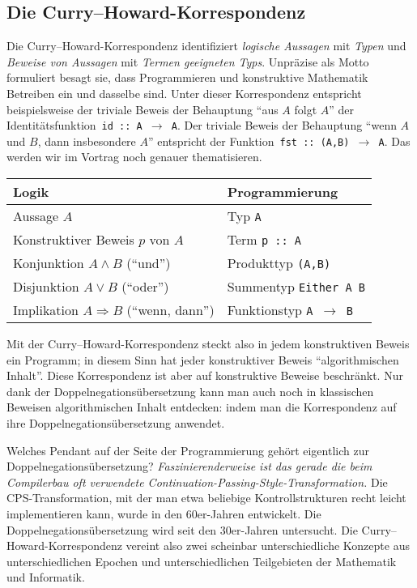 \documentclass[a4paper,ngerman,10pt]{scrartcl}
\theoremstyle{plain}
\begin{document}
\subsection*{Die Curry--Howard-Korrespondenz}

Die Curry--Howard-Korrespondenz identifiziert \emph{logische Aussagen} mit
\emph{Typen} und \emph{Beweise von Aussagen} mit \emph{Termen geeigneten Typs}.
Unpräzise als Motto formuliert besagt sie, dass Programmieren und konstruktive
Mathematik Betreiben ein und dasselbe sind. Unter dieser Korrespondenz
entspricht beispielsweise der triviale Beweis der Behauptung "`aus $A$ folgt
$A$"' der Identitätsfunktion~\texttt{id :: A $\to$ A}. Der triviale Beweis der
Behauptung "`wenn $A$ und $B$, dann insbesondere $A$"' entspricht der
Funktion~\texttt{fst :: (A,B) $\to$ A}. Das werden wir im Vortrag noch genauer
thematisieren.

\begin{center}\begin{tabular}{ll}
  \toprule
  Logik & Programmierung \\\midrule
  Aussage $A$ & Typ \texttt{A} \\
  Konstruktiver Beweis $p$ von $A$ & Term \texttt{p :: A} \\
  Konjunktion $A \wedge B$ ("`und"') & Produkttyp \texttt{(A,B)} \\
  Disjunktion $A \vee B$ ("`oder"') & Summentyp \texttt{Either A B} \\
  Implikation $A \Rightarrow B$ ("`wenn, dann"') & Funktionstyp \texttt{A $\to$ B} \\
  \bottomrule
\end{tabular}\end{center}

Mit der Curry--Howard-Korrespondenz steckt also in jedem konstruktiven Beweis
ein Programm; in diesem Sinn hat jeder konstruktiver Beweis "`algorithmischen
Inhalt"'. Diese Korrespondenz ist aber auf konstruktive Beweise beschränkt. Nur
dank der Doppelnegationsübersetzung kann man auch noch in klassischen Beweisen
algorithmischen Inhalt entdecken: indem man die Korrespondenz auf ihre
Doppelnegationsübersetzung anwendet.

Welches Pendant auf der Seite der Programmierung gehört eigentlich zur
Dop\-pel\-ne\-ga\-tions\-über\-set\-zung? \emph{Faszinierenderweise ist das gerade die beim
Compilerbau oft verwendete Continuation-Passing-Style-Transformation.} Die
CPS-Transformation, mit der man etwa beliebige Kontrollstrukturen recht leicht
implementieren kann, wurde in den 60er-Jahren entwickelt. Die
Doppelnegationsübersetzung wird seit den 30er-Jahren untersucht. Die
Curry--Howard-Korrespondenz vereint also zwei scheinbar unterschiedliche
Konzepte aus unterschiedlichen Epochen und unterschiedlichen Teilgebieten der
Mathematik und Informatik.
\end{document}
